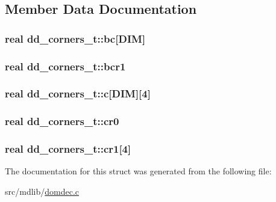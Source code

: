 \subsection{\-Member \-Data \-Documentation}
\hypertarget{structdd__corners__t_a234b7f0bcfb7bf6ce5993ca3d1cf56ca}{
\subsubsection[{bc}]{\setlength{\rightskip}{0pt plus 5cm}real {\bf dd\-\_\-corners\-\_\-t\-::bc}\mbox{[}{\bf \-D\-I\-M}\mbox{]}}}\label{structdd__corners__t_a234b7f0bcfb7bf6ce5993ca3d1cf56ca}
\hypertarget{structdd__corners__t_a2126969ac702e536abd1492f13c290c9}{
\subsubsection[{bcr1}]{\setlength{\rightskip}{0pt plus 5cm}real {\bf dd\-\_\-corners\-\_\-t\-::bcr1}}}\label{structdd__corners__t_a2126969ac702e536abd1492f13c290c9}
\hypertarget{structdd__corners__t_a7a866a0d1a1e47f534f74f748600adc1}{
\subsubsection[{c}]{\setlength{\rightskip}{0pt plus 5cm}real {\bf dd\-\_\-corners\-\_\-t\-::c}\mbox{[}{\bf \-D\-I\-M}\mbox{]}\mbox{[}4\mbox{]}}}\label{structdd__corners__t_a7a866a0d1a1e47f534f74f748600adc1}
\hypertarget{structdd__corners__t_aba389aeb3fabf156a3b8e02bd1be0159}{
\subsubsection[{cr0}]{\setlength{\rightskip}{0pt plus 5cm}real {\bf dd\-\_\-corners\-\_\-t\-::cr0}}}\label{structdd__corners__t_aba389aeb3fabf156a3b8e02bd1be0159}
\hypertarget{structdd__corners__t_a5f5f84610ade2c8926f615e0a679fc49}{
\subsubsection[{cr1}]{\setlength{\rightskip}{0pt plus 5cm}real {\bf dd\-\_\-corners\-\_\-t\-::cr1}\mbox{[}4\mbox{]}}}\label{structdd__corners__t_a5f5f84610ade2c8926f615e0a679fc49}


\-The documentation for this struct was generated from the following file\-:\begin{DoxyCompactItemize}
\item 
src/mdlib/\hyperlink{domdec_8c}{domdec.\-c}\end{DoxyCompactItemize}
